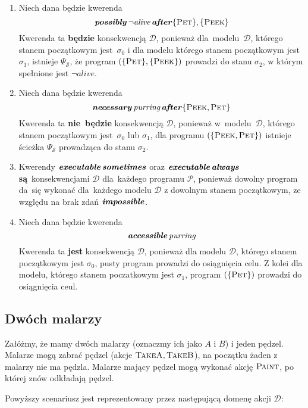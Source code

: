 \documentclass[11pt,a4paper]{article}
\DeclareMathOperator{\After}{\textbf{\textit{after}}}
\DeclareMathOperator{\Impossible}{\textbf{\textit{impossible}}}
\DeclareMathOperator{\Always}{\textbf{\textit{always}}}
\DeclareMathOperator{\Sometimes}{\textbf{\textit{sometimes}}}
\DeclareMathOperator{\Executable}{\textbf{\textit{executable}}}
\DeclareMathOperator{\Accessible}{\textbf{\textit{accessible}}}
\DeclareMathOperator{\Possibly}{\textbf{\textit{possibly}}}
\DeclareMathOperator{\Necessary}{\textbf{\textit{necessary}}}
\begin{document}
\begin{enumerate}
    \item Niech dana będzie kwerenda
    $$ \Possibly \neg \textit{alive} \After \{ \textsc{Pet} \}, \{ \textsc{Peek} \} $$
    Kwerenda ta \textbf{będzie} konsekwencją $\mathcal{D}$, ponieważ dla~modelu~$\mathcal{D}$, którego stanem początkowym jest~$\sigma_0$ i dla modelu którego stanem początkowym jest $\sigma_1$, istnieje $\Psi_\mathcal{S}$, że program $(\{ \textsc{Pet} \}, \{ \textsc{Peek} \})$ prowadzi do stanu $\sigma_2$, w którym spełnione jest $\neg \textit{alive}$.

    \item Niech dana będzie kwerenda
    $$ \Necessary \textit{purring} \After \{ \textsc{Peek}, \textsc{Pet} \} $$
    Kwerenda ta \textbf{nie~będzie} konsekwencją $\mathcal{D}$, ponieważ w~modelu~$\mathcal{D}$, którego stanem początkowym jest~$\sigma_0$ lub $\sigma_1$, dla programu $(\{ \textsc{Peek}, \textsc{Pet} \})$ istnieje ścieżka $\Psi_\mathcal{S}$ prowadząca   do stanu $\sigma_2$.

    \item Kwerendy $\Executable \Sometimes$ oraz $\Executable \Always$ \textbf{są}~konsekwencjami $\mathcal{D}$ dla~każdego programu $\mathcal{P}$, ponieważ dowolny program da~się wykonać dla~każdego modelu $\mathcal{D}$ z dowolnym stanem początkowym, ze względu na brak zdań $\Impossible$.

    \item Niech dana będzie kwerenda
    $$ \Accessible \textit{purring} $$
    Kwerenda ta \textbf{jest} konsekwencją $\mathcal{D}$, ponieważ dla modelu $\mathcal{D}$, którego stanem początkowym jest $\sigma_0$, pusty program prowadzi do osiągnięcia celu. Z kolei dla modelu, którego stanem poczatkowym jest $\sigma_1$, program $(\{\textsc{Pet}\})$ prowadzi do osiągnięcia ceul.
\end{enumerate}

\subsection{Dwóch malarzy}
Załóżmy, że mamy dwóch malarzy (oznaczmy ich jako $A$ i $B$) i jeden pędzel. Malarze mogą zabrać pędzel (akcje $\textsc{TakeA},\textsc{TakeB}$), na początku żaden z malarzy nie ma pędzla. Malarze mający pędzel mogą wykonać akcję $\textsc{Paint}$, po której znów odkładają pędzel.

Powyższy scenariusz jest reprezentowany przez następującą domenę akcji $\mathcal{D}$:
\end{document}
